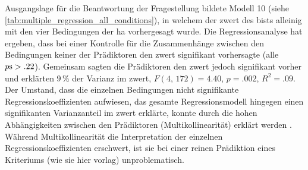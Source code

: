 \documentclass[11pt, twoside, a4paper]{book}		%
\begin{document}
Ausgangslage für die Beantwortung der Fragestellung bildete Modell 10 (siehe \autoref{tab:multiple_regression_all_conditions}), in welchem der \gls{zwert} des \gls{bist}s alleinig mit den vier Bedingungen der \gls{ha} vorhergesagt wurde. Die Regressionsanalyse hat ergeben, dass 
bei einer Kontrolle für die Zusammenhänge zwischen den Bedingungen keiner der Prädiktoren den \gls{zwert} signifikant vorhersagte (alle $p\textnormal{s}>.22$). Gemeinsam sagten die Prädiktoren den \gls{zwert} jedoch signifikant vorher und erklärten $9\,\%$ der Varianz im \gls{zwert}, $F(4,\,172)=4.40$, $p=.002$, $R^2=.09$.
Der Umstand, dass die einzelnen Bedingungen nicht signifikante Regressionskoeffizienten aufwiesen, das gesamte Regressionsmodell hingegen einen signifikanten Varianzanteil im \gls{zwert} erklärte, konnte durch die hohen Abhängigkeiten zwischen den Prädiktoren (Multikollinearität) erklärt werden \citep[S. 686]{Eid2013}. Während Multikollinearität die Interpretation der einzelnen Regressionskoeffizienten erschwert, ist sie bei einer reinen Prädiktion eines Kriteriums (wie sie hier vorlag) unproblematisch.
\end{document}
